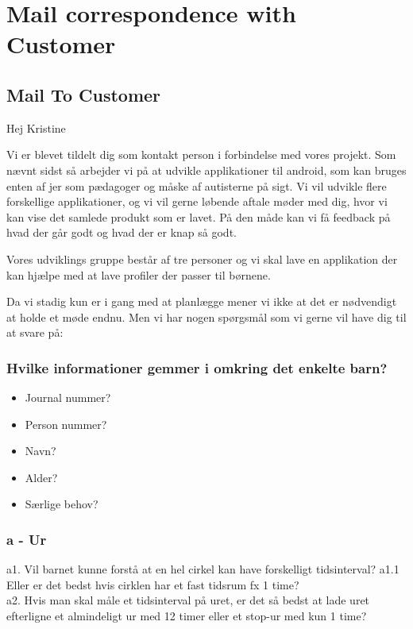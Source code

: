 \section{Mail correspondence with Customer}
\subsection{Mail To Customer}
Hej Kristine

Vi er blevet tildelt dig som kontakt person i forbindelse med vores projekt. Som n\ae{}vnt sidst s\aa{} arbejder vi p\aa{} at udvikle applikationer til android, som kan bruges enten af jer som p\ae{}dagoger og m\aa{}ske af autisterne p\aa{} sigt. Vi vil udvikle flere forskellige applikationer, og vi vil gerne l\o{}bende aftale m\o{}der med dig, hvor vi kan vise det samlede produkt som er lavet. P\aa{} den m\aa{}de kan vi f\aa{} feedback p\aa{} hvad der g\aa{}r godt og hvad der er knap s\aa{} godt.

Vores udviklings gruppe best\aa{}r af tre personer og vi skal lave en applikation der kan hj\ae{}lpe med at lave profiler der passer til b\o{}rnene. 

Da vi stadig kun er i gang med at planl\ae{}gge mener vi ikke at det er n\o{}dvendigt at holde et m\o{}de endnu. Men vi har nogen sp\o{}rgsm\aa{}l som vi gerne vil have dig til at svare p\aa{}:

\subsubsection{Hvilke informationer gemmer i omkring det enkelte barn?}
\begin{itemize}
	\item Journal nummer?
	\item Person nummer?
	\item Navn?
	\item Alder?
	\item S\ae{}rlige behov?
\end{itemize}

\subsubsection{a - Ur}
a1. Vil barnet kunne forst\aa{} at en hel cirkel kan have forskelligt tidsinterval?
a1.1 Eller er det bedst hvis cirklen har et fast tidsrum fx 1 time?
\\
a2. Hvis man skal m\aa{}le et tidsinterval p\aa{} uret, er det s\aa{} bedst at lade uret efterligne et almindeligt ur med 12 timer eller et stop-ur med kun 1 time?

